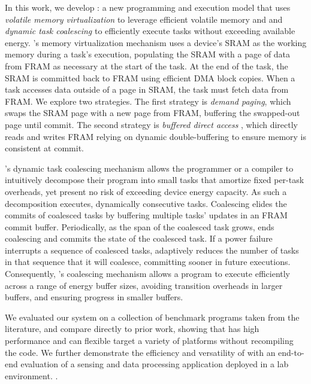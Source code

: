 In this work, we develop \sys: a new programming and execution model that uses
{\em volatile memory virtualization} to leverage efficient volatile memory and
and {\em dynamic task coalescing} to efficiently execute tasks without
exceeding available energy. \sys's memory virtualization mechanism uses a
device's SRAM as the working memory during a task's execution, populating the
SRAM with a page of data from FRAM as necessary at the start of the task. At
the end of the task, the SRAM is committed back to FRAM using efficient DMA
block copies.  When a task accesses data outside of a page in SRAM,
the task must fetch data from FRAM. We explore two strategies. The first
strategy is {\em demand paging}, which swaps the SRAM page with a new page from
FRAM, buffering the swapped-out page until commit. The second strategy is {\em
buffered direct access} , which directly reads and writes
FRAM relying on dynamic double-buffering to ensure memory is consistent at
commit.

\sys's dynamic task coalescing mechanism allows the programmer or a compiler to
intuitively decompose their program into small tasks that amortize fixed
per-task overheads, yet present no risk of exceeding device energy capacity. As
such a decomposition executes,  dynamically consecutive
tasks. Coalescing elides the commits of coalesced tasks by buffering multiple
tasks' updates in an FRAM commit buffer. Periodically, as the span of the
coalesced task grows, \sys ends coalescing and commits the state of the
coalesced task. If a power failure interrupts a sequence of coalesced tasks,
\sys adaptively reduces the number of tasks in that sequence that it will
coalesce, committing sooner in future executions. Consequently, \sys's
coalescing mechanism allows a program to execute efficiently across a range of
energy buffer sizes, avoiding transition overheads in larger buffers, and
ensuring progress in smaller buffers. 

We evaluated our system on a collection of benchmark programs taken from the
literature, and compare directly to prior work, showing that \sys has high
performance and can flexible target a variety of platforms without recompiling
the code. We further demonstrate the efficiency and versatility of \sys with
an end-to-end evaluation of a sensing and data processing application deployed
in a lab environment. .

